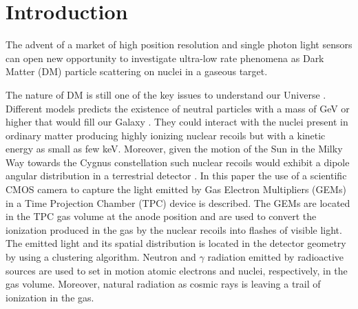 \documentclass[12pt]{iopart}
\begin{document}
%
%
%
% 
%



\section{Introduction}


The advent of a market of high position resolution and single photon
light sensors can open new opportunity to investigate ultra-low rate
phenomena as Dark Matter (DM) particle scattering on nuclei in a
gaseous target.

The nature of DM is still one of the key issues to understand our
Universe \cite{PhysRevLett.39.165,Undagoitia_2015}.  Different models
predicts the existence of neutral particles with a mass of GeV or
higher that would fill our Galaxy \cite{PhysRevLett.113.171301} \cite{PhysRevD.79.115016,doi:10.1142/S0217751X13300287,ZUREK201491}. They could interact with the nuclei
present in ordinary matter producing highly ionizing nuclear recoils
but with a kinetic energy as small as few keV. Moreover, given the
motion of the Sun in the Milky Way towards the Cygnus constellation
such nuclear recoils would exhibit a dipole angular distribution in a
terrestrial detector \cite{MAYET20161}.  In this paper the use of a scientific CMOS
camera to capture the light emitted by Gas Electron Multipliers (GEMs)
in a Time Projection Chamber (TPC) device is described. The GEMs are
located in the TPC gas volume at the anode position and are used to
convert the ionization produced in the gas by the nuclear recoils into
flashes of visible light. The emitted light and its spatial
distribution is located in the detector geometry by using a clustering
algorithm. Neutron and $\gamma$ radiation emitted by radioactive
sources are used to set in motion atomic electrons and nuclei,
respectively, in the gas volume. Moreover, natural radiation as cosmic
rays is leaving a trail of ionization in the gas.
\end{document}
